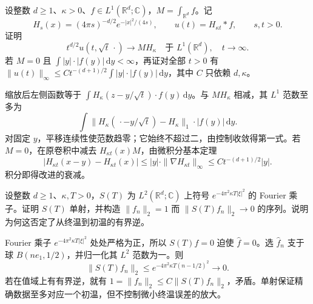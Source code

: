 \begin{exercise}\label{b2:ex:12-mass-asymptotic}
设整数 \(d\geq1\)、\(\kappa>0\)、\(f\in L^1(\mathbb R^d;\mathbb C)\)，\(M=\int_{\mathbb R^d}f\)。记
\[
 H_s(x)=(4\pi s)^{-d/2}e^{-|x|^2/(4s)},
 \qquad u(t)=H_{\kappa t}*f,\qquad s,t>0.
\]
证明
\[
 t^{d/2}u(t,\sqrt t\,\cdot)\longrightarrow M H_\kappa
 \quad\text{于 }L^1(\mathbb R^d),\quad t\to\infty.
\]
若 \(M=0\) 且 \(\int |y|\cdot|f(y)|\,\mathrm{d}y<\infty\)，再证对全部 \(t>0\) 有 \(\|u(t)\|_\infty\leq Ct^{-(d+1)/2}\int |y|\cdot|f(y)|\,\mathrm{d}y\)，其中 \(C\) 只依赖 \(d,\kappa\)。
\end{exercise}
\begin{solution}
缩放后左侧函数等于 \(\int H_\kappa(z-y/\sqrt t)\cdot f(y)\,\mathrm{d}y\)。与 \(MH_\kappa\) 相减，其 \(L^1\) 范数至多为
\[
 \int\|H_\kappa(\,\cdot-y/\sqrt t)-H_\kappa\|_1\cdot|f(y)|\,\mathrm{d}y.
\]
对固定 \(y\)，平移连续性使范数趋零；它始终不超过二，由控制收敛得第一式。若 \(M=0\)，在原卷积中减去 \(H_{\kappa t}(x)M\)，由微积分基本定理
\[
 |H_{\kappa t}(x-y)-H_{\kappa t}(x)|
 \leq |y|\cdot\|\nabla H_{\kappa t}\|_\infty
 \leq Ct^{-(d+1)/2}|y|.
\]
积分即得改进的衰减。
\end{solution}

\begin{exercise}\label{b2:ex:12-backward-instability}
设整数 \(d\geq1\)、\(\kappa,T>0\)，\(S(T)\) 为 \(L^2(\mathbb R^d;\mathbb C)\) 上符号 \(e^{-4\pi^2\kappa T|\xi|^2}\) 的 Fourier 乘子。证明 \(S(T)\) 单射，并构造 \(\|f_n\|_2=1\) 而 \(\|S(T)f_n\|_2\to0\) 的序列。说明为何这否定了从终温到初温的有界逆。
\end{exercise}
\begin{solution}
Fourier 乘子 \(e^{-4\pi^2\kappa T|\xi|^2}\) 处处严格为正，所以 \(S(T)f=0\) 迫使 \(\widehat f=0\)。选 \(\widehat f_n\) 支于球 \(B(ne_1,1/2)\)，并归一化其 \(L^2\) 范数为一。则
\[
 \|S(T)f_n\|_2\leq e^{-4\pi^2\kappa T(n-1/2)^2}\longrightarrow0.
\]
若在值域上有有界逆，就有 \(1=\|f_n\|_2\leq C\|S(T)f_n\|_2\)，矛盾。单射保证精确数据至多对应一个初温，但不控制微小终温误差的放大。
\end{solution}

